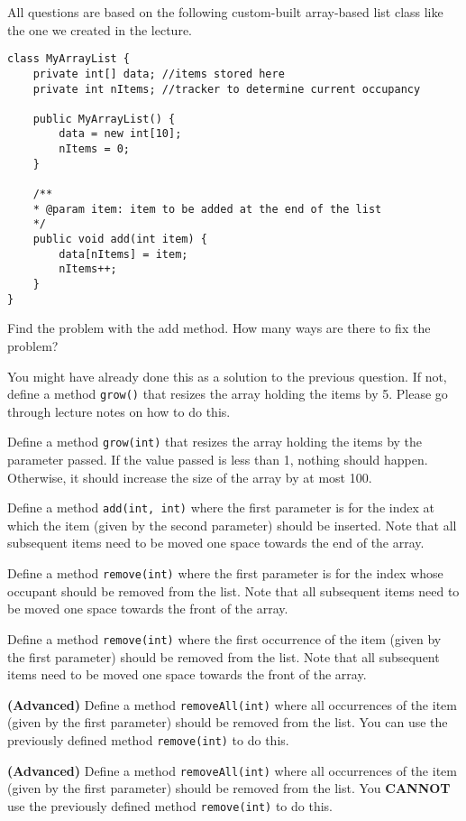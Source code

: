 \documentclass{exam}
\begin{document}
\begin{questions}
All questions are based on the following custom-built array-based list class like the one we created in the lecture.

\begin{lstlisting}
class MyArrayList {
	private int[] data; //items stored here
	private int nItems; //tracker to determine current occupancy
	
	public MyArrayList() {
		data = new int[10];
		nItems = 0;
	}
	
	/**
	* @param item: item to be added at the end of the list
	*/
	public void add(int item) {
		data[nItems] = item;
		nItems++;
	}
}
\end{lstlisting}

\question Find the problem with the add method. How many ways are there to fix the problem?

\question You might have already done this as a solution to the previous question. If not, define a method \texttt{grow()} that resizes the array holding the items by 5. Please go through lecture notes on how to do this.

\question Define a method \texttt{grow(int)} that resizes the array holding the items by the parameter passed. If the value passed is less than 1, nothing should happen. Otherwise, it should increase the size of the array by at most 100.

\question Define a method \texttt{add(int, int)} where the first parameter is for the index at which the item (given by the second parameter) should be inserted. Note that all subsequent items need to be moved one space towards the end of the array.

\question Define a method \texttt{remove(int)} where the first parameter is for the index whose occupant should be removed from the list. Note that all subsequent items need to be moved one space towards the front of the array.	

\question Define a method \texttt{remove(int)} where the first occurrence of the item (given by the first parameter) should be removed from the list. Note that all subsequent items need to be moved one space towards the front of the array.

\question \textbf{(Advanced)} Define a method \texttt{removeAll(int)} where all occurrences of the item (given by the first parameter) should be removed from the list. You can use the previously defined method \texttt{remove(int)} to do this.

\question \textbf{(Advanced)} Define a method \texttt{removeAll(int)} where all occurrences of the item (given by the first parameter) should be removed from the list. You \textbf{CANNOT} use the previously defined method \texttt{remove(int)} to do this.
\end{questions}
\end{document}
